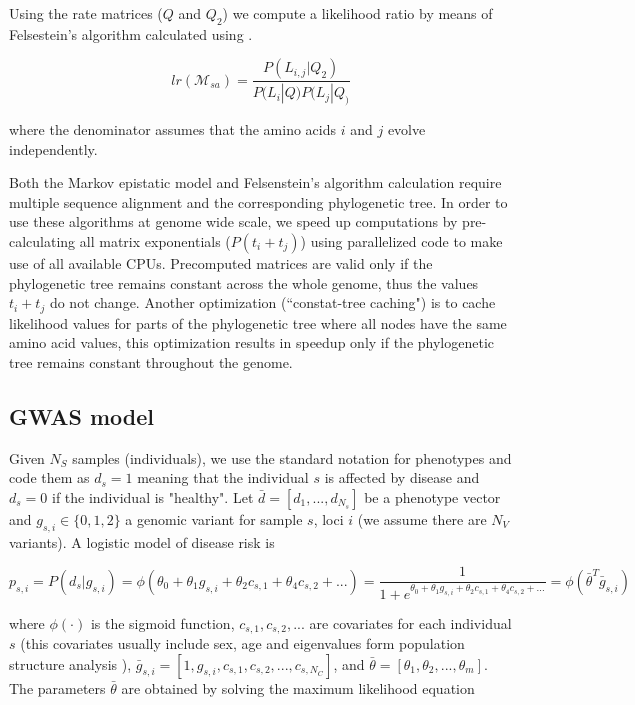 Using the rate matrices ($Q$ and $Q_2$) we compute a likelihood ratio by means of Felsestein’s algorithm calculated using .

\[
lr(\mathcal{M}_{sa}) = \frac{P(L_{i,j} | Q_2)}{P(L_i | Q) P(L_j | Q_)}
\]

where the denominator assumes that the amino acids $i$ and $j$ evolve independently. 

Both the Markov epistatic model and Felsenstein’s algorithm calculation require multiple sequence alignment and the corresponding phylogenetic tree. In order to use these algorithms at genome wide scale, we speed up computations by pre-calculating all matrix exponentials ($P(t_i+t_j)$) using parallelized code to make use of all available CPUs. Precomputed matrices are valid only if the phylogenetic tree remains constant across the whole genome, thus the values $t_i+t_j$ do not change. Another optimization (``constat-tree caching") is to cache likelihood values for parts of the phylogenetic tree where all nodes have the same amino acid values, this optimization results in speedup only if the phylogenetic tree remains constant throughout the genome.

\subsection{GWAS model}

Given $N_S$ samples (individuals), we use the standard notation for phenotypes and code them as $d_s=1$ meaning that the individual $s$ is affected by disease and $d_s=0$ if the individual is "healthy". Let $\bar{d} = [d_1, ..., d_{N_s}]$ be a phenotype vector and $g_{s,i} \in \{0,1,2\}$ a genomic variant for sample $s$, loci $i$ (we assume there are $N_V$ variants). A logistic model of disease risk \cite{balding2006tutorial} is

\[
p_{s,i} = P( d_s | g_{s,i} ) = \phi( \theta_0 + \theta_1 g_{s,i} + \theta_2 c_{s,1} + \theta_4 c_{s,2} + ... ) = \frac{1}{1 + e^{\theta_0 + \theta_1 g_{s,i} + \theta_2 c_{s,1} + \theta_4 c_{s,2} + ...}} = \phi( \bar{\theta}^T \bar{g}_{s,i})
\]

where $\phi(\cdot)$ is the sigmoid function, $c_{s,1}, c_{s,2}, ... $ are covariates for each individual $s$ (this covariates usually include sex, age and eigenvalues form population structure analysis \cite{price2006principal}), $\bar{g}_{s,i} = [ 1, g_{s,i} , c_{s,1}, c_{s,2}, ... , c_{s,N_C} ]$, and $\bar{\theta} = [\theta_1, \theta_2, ..., \theta_m] $. The parameters $\bar{\theta}$ are obtained by solving the maximum likelihood equation

